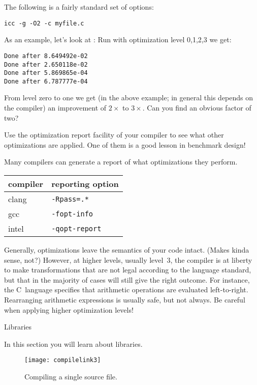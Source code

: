 The following is a fairly standard set of options:
\begin{verbatim}
icc -g -O2 -c myfile.c
\end{verbatim}

As an example, let's look at :
Run with optimization level 0,1,2,3 we get:
\begin{verbatim}
Done after 8.649492e-02
Done after 2.650118e-02
Done after 5.869865e-04
Done after 6.787777e-04
\end{verbatim}
\begin{exercise}
  \label{ex:givens-optimize}
  From level zero to one we get (in the above example;
  in general this depends on the compiler) an improvement
  of $2\times$ to $3\times$. Can you find an obvious factor of two?

  Use the optimization report facility of your compiler to see what
  other optimizations are applied. One of them is a good lesson in
  benchmark design!
\end{exercise}

Many compilers can generate a report of what optimizations they perform.

\begin{tabular}{ll}
  \toprule
  compiler&reporting option\\
  \midrule
  clang& \texttt{-Rpass=.*}\\
  gcc&   \texttt{-fopt-info}\\
  intel& \texttt{-qopt-report}\\
  \bottomrule
\end{tabular}

Generally, optimizations leave the semantics of your code
intact. (Makes kinda sense, not?)  However, at higher levels,
usually level~3, the compiler is
at liberty to make transformations that are not legal
according to the language standard, but that in the majority of cases
will still give the right outcome. For instance, the C~language
specifies that arithmetic operations are evaluated left-to-right.
Rearranging arithmetic expressions is usually safe, but not always.
Be careful when applying higher optimization levels!

 {Libraries}

\begin{purpose}
  In this section you will learn about libraries.
\end{purpose}

\begin{figure}[ht]
  \texttt{[image: compilelink3]}
  \caption{Compiling a single source file.}
  \label{fig:compilelink3}
\end{figure}

